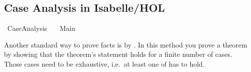 %
\begin{isabellebody}%
%
%
\begin{isamarkuptext}%
\section*{Case Analysis in Isabelle/HOL}%
\end{isamarkuptext}\isamarkuptrue%
%
\isadelimtheory
%
\endisadelimtheory
%
\isatagtheory
{}\isamarkupfalse%
\ CaseAnalysis\isanewline
\ \ \ Main\isanewline
{}%
\endisatagtheory
{\isafoldtheory}%
%
\isadelimtheory
%
\endisadelimtheory
%
\begin{isamarkuptext}%
Another standard way to prove facts is by . In this method you prove a theorem
      by showing that the theorem's statement holds for a finite number of cases. Those cases
      need to be exhaustive, i.e.\ at least one of has to hold.


\end{isamarkuptext}
\end{isabellebody}
